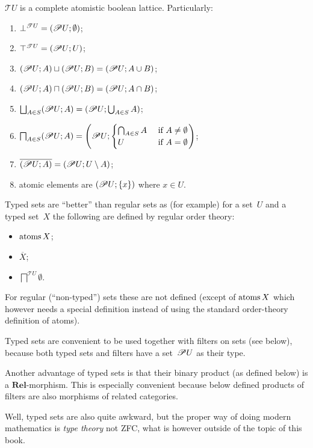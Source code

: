 \begin{obvious}
$\mathscr{T}U$ is a complete atomistic boolean lattice. Particularly:
\begin{enumerate}
\item $\bot^{\mathscr{T}U}=(\mathscr{P} U;\emptyset)$;
\item $\top^{\mathscr{T}U}=(\mathscr{P} U;U)$;
\item $(\mathscr{P} U;A)\sqcup(\mathscr{P} U;B)=(\mathscr{P} U;A\cup B)$;
\item $(\mathscr{P} U;A)\sqcap(\mathscr{P} U;B)=(\mathscr{P} U;A\cap B)$;
\item $\bigsqcup_{A\in S}(\mathscr{P} U;A)=(\mathscr{P} U;\bigcup_{A\in S}A)$;
\item $\bigsqcap_{A\in S}(\mathscr{P} U;A)=\left(\mathscr{P} U;\begin{cases}\bigcap_{A\in S}A&\text{ if }A\ne\emptyset\\U&\text{ if }A=\emptyset\end{cases}\right)$;
\item $\overline{(\mathscr{P} U;A)}=(\mathscr{P} U;U\setminus A)$;
\item atomic elements are $(\mathscr{P} U;\{x\})$ where $x\in U$.
\end{enumerate}
Typed sets are ``better'' than regular sets as (for example) for
a set~$U$ and a typed set~$X$ the following are defined by regular
order theory:\end{obvious}
\begin{itemize}
\item $\operatorname{atoms} X$;
\item $\overline{X}$;
\item $\bigsqcap^{\mathscr{T}U}\emptyset$.
\end{itemize}
For regular (``non-typed'') sets these are not defined (except of
$\operatorname{atoms} X$ which however needs a special definition instead of using
the standard order-theory definition of atoms).

Typed sets are convenient to be used together with filters on sets
(see below), because both typed sets and filters have a set~$\mathscr{P} U$
as their type.

Another advantage of typed sets is that their binary product (as defined
below) is a $\mathbf{Rel}$-morphism. This is especially convenient
because below defined products of filters are also morphisms of related
categories.

Well, typed sets are also quite awkward, but the proper way of doing
modern mathematics is \emph{type theory} not ZFC, what is however
outside of the topic of this book.


